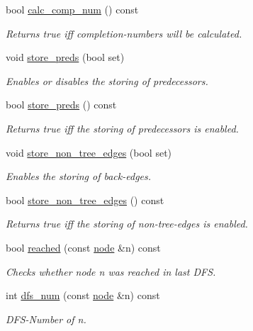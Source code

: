 \begin{DoxyCompactItemize}
bool \mbox{\hyperlink{classdfs_aba80ac24a78448f10b32473633cd2a5d}{calc\+\_\+comp\+\_\+num}} () const
\begin{DoxyCompactList}\small\item\em Returns true iff completion-\/numbers will be calculated. \end{DoxyCompactList}\item 
void \mbox{\hyperlink{classdfs_a7043f46eb3887cbcbb1391fc783407a4}{store\+\_\+preds}} (bool set)
\begin{DoxyCompactList}\small\item\em Enables or disables the storing of predecessors. \end{DoxyCompactList}\item 
bool \mbox{\hyperlink{classdfs_ad0233128f2958d630102096aa6f3b9ef}{store\+\_\+preds}} () const
\begin{DoxyCompactList}\small\item\em Returns true iff the storing of predecessors is enabled. \end{DoxyCompactList}\item 
void \mbox{\hyperlink{classdfs_a6f54f1c4339eacc8961e795439d4593d}{store\+\_\+non\+\_\+tree\+\_\+edges}} (bool set)
\begin{DoxyCompactList}\small\item\em Enables the storing of back-\/edges. \end{DoxyCompactList}\item 
bool \mbox{\hyperlink{classdfs_a6ac1f01ff594fbbc6e8d6b5bd03fc9ab}{store\+\_\+non\+\_\+tree\+\_\+edges}} () const
\begin{DoxyCompactList}\small\item\em Returns true iff the storing of non-\/tree-\/edges is enabled. \end{DoxyCompactList}\item 
bool \mbox{\hyperlink{classdfs_a2948061eb1ea02f57614f9044c8e63cf}{reached}} (const \mbox{\hyperlink{classnode}{node}} \&n) const
\begin{DoxyCompactList}\small\item\em Checks whether node {\itshape n} was reached in last D\+FS. \end{DoxyCompactList}\item 
int \mbox{\hyperlink{classdfs_a315f16831a0bd333960e87e045cb37c8}{dfs\+\_\+num}} (const \mbox{\hyperlink{classnode}{node}} \&n) const
\begin{DoxyCompactList}\small\item\em D\+F\+S-\/\+Number of {\itshape n}. \end{DoxyCompactList}\item 

\end{DoxyCompactItemize}
